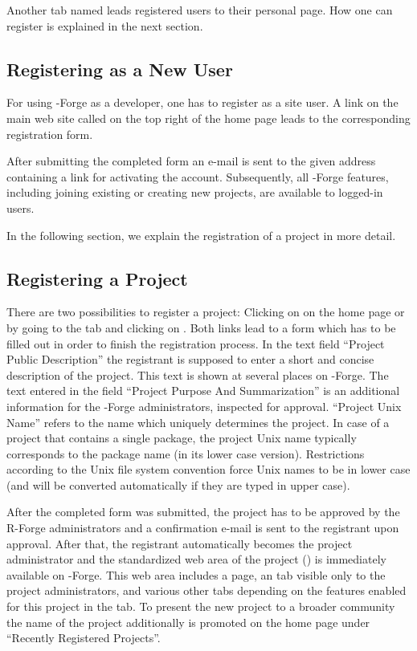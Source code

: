 Another tab named  leads registered users
to their personal page. How one can register is explained in
the next section.

\subsection{Registering as a New User}

For using \R{}-Forge as a developer, one has
to register as a site user. A link on the main web site called
 on the top right of the home page leads to the
corresponding registration form.

After submitting the completed form an e-mail is sent to the given
address containing a link for activating the account. Subsequently,
all \R{}-Forge features, including joining existing or creating
new projects, are available to logged-in users.

In the following section, we explain the registration of a project in
more detail.  

\subsection{Registering a Project}

There are two possibilities to register a project: Clicking on
 on the home page or by going to the  tab and clicking on . Both links lead to a
form which has to be filled out in order to finish the registration
process. In the text field ``Project Public Description'' the
registrant is supposed to enter a short and concise description of the
project. This text is shown at several places on \R{}-Forge. The text
entered in the field ``Project Purpose And Summarization'' is an
additional information for the \R{}-Forge administrators, inspected
for approval. ``Project Unix
Name'' refers to the name which 
uniquely determines the project. In case of a project that contains a
single \R{} package, the project Unix name typically corresponds to
the package name (in its lower case version). Restrictions according to
the Unix file system convention force Unix names to be in lower case
(and will be converted automatically if they are typed in upper case).

After the completed form was submitted, the project has to be approved
by the R-Forge administrators and a confirmation e-mail is sent to the
registrant upon approval. After that, the registrant automatically
becomes the project 
administrator and the standardized web area of the project
() is
immediately available on \R{}-Forge. 
This web area includes a  page, an  tab
visible only to the project administrators, and various other tabs
depending on the features enabled for this project in the 
tab. To present the new project to a broader community the name of the
project additionally is promoted on the home page under ``Recently
Registered Projects''.

